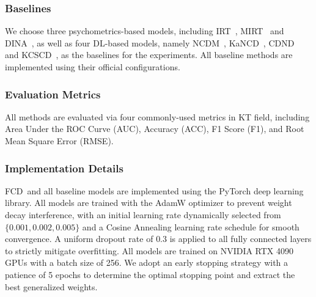 \documentclass[runningheads]{llncs}
\def\mymethod{FCD}
\begin{document}
\subsubsection{Baselines}
We choose three psychometrics-based models, including IRT~\cite{fan1998item}, MIRT~\cite{reckase2009multidimensional} and DINA~\cite{delatorre2009dina,bigdata2021educdm},  as well as four DL-based models, namely NCDM~\cite{wang2020neural}, KaNCD~\cite{wang2022neuralcd}, CDND~\cite{zhang2025cognitive} and KCSCD~\cite{zhang2026knowledge}, as the baselines for the experiments. All baseline methods are implemented using their official configurations.

\subsubsection{Evaluation Metrics}
All methods are evaluated via four commonly-used metrics in KT field, including Area Under the ROC Curve (AUC), Accuracy (ACC), F1 Score (F1), and Root Mean Square Error (RMSE).

\subsubsection{Implementation Details}
\mymethod\ and all baseline models are implemented using the PyTorch deep learning library. All models are trained with the AdamW optimizer to prevent weight decay interference, with an initial learning rate dynamically selected from $\{0.001, 0.002, 0.005\}$ and a Cosine Annealing learning rate schedule for smooth convergence. A uniform dropout rate of $0.3$ is applied to all fully connected layers to strictly mitigate overfitting.
All models are trained on NVIDIA RTX 4090 GPUs with a batch size of 256. We adopt an early stopping strategy with a patience of 5 epochs to determine the optimal stopping point and extract the best generalized weights.
\end{document}
